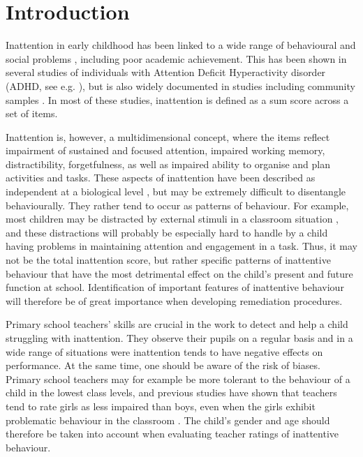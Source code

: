 \documentclass[10pt,letterpaper]{article}
\begin{document}
\linenumbers

\section*{Introduction}
Inattention in early childhood has been linked to a wide range of behavioural and social problems \cite{Bellanti2000, Connors2012},  including poor academic achievement. This has been shown in several studies of individuals with Attention Deficit Hyperactivity disorder 
(ADHD, see e.g. \cite{Lee2006, Owens2017}), but is also widely documented in studies including community samples \cite{Polderman2010, Metcalfe2013, Pingault2014, Garner2013, Holmberg2014, Gray2014, Salla2016}.  In most of these studies, inattention is defined as a sum score across a set of items.

Inattention is, however, a multidimensional concept,  where the items 
reflect impairment of sustained and focused attention, impaired working memory, distractibility, forgetfulness, as well as impaired ability to organise and plan activities and tasks. These aspects of inattention have been described as independent at a biological level  \cite{Berry2014}, but may be extremely difficult to disentangle behaviourally. They rather tend to occur as patterns of behaviour. For example, most children may be distracted by external stimuli in a classroom situation \cite{Rescorla2007}, and these distractions will probably be especially hard to handle by a child having problems in maintaining attention and engagement in a task. Thus, it may not be the total inattention score, but rather specific patterns of inattentive behaviour that have the most detrimental effect on the child's present and future function at school. Identification of important features of inattentive behaviour will therefore be of great importance when developing remediation procedures. 

Primary school teachers' skills are crucial in the work to detect and help a child struggling with inattention. They observe their pupils on a regular basis and in a wide range of situations were inattention tends to have negative effects on performance. At the same time, one should be aware of the risk of biases. Primary school teachers may for example be more tolerant to the behaviour of a child in the lowest class levels, and previous studies have shown that teachers tend to rate girls as less impaired than boys, even when the girls exhibit problematic behaviour in the classroom \cite{Becker2013, Bussing2003c, Ohan2009}. The child's gender and age should therefore be taken into account when evaluating teacher ratings of inattentive behaviour. \\
\end{document}
